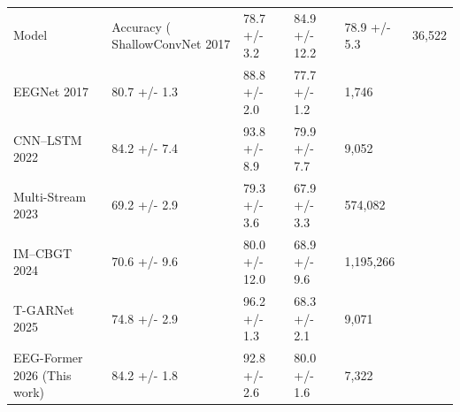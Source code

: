 \begin{tabular}{lllll}
\toprule
Model & Accuracy (%
\midrule
ShallowConvNet 2017 & 78.7 +/- 3.2 & 84.9 +/- 12.2 & 78.9 +/- 5.3 & 36,522 \\
EEGNet 2017 & 80.7 +/- 1.3 & 88.8 +/- 2.0 & 77.7 +/- 1.2 & 1,746 \\
CNN--LSTM 2022 & 84.2 +/- 7.4 & 93.8 +/- 8.9 & 79.9 +/- 7.7 & 9,052 \\
Multi-Stream 2023 & 69.2 +/- 2.9 & 79.3 +/- 3.6 & 67.9 +/- 3.3 & 574,082 \\
IM--CBGT 2024 & 70.6 +/- 9.6 & 80.0 +/- 12.0 & 68.9 +/- 9.6 & 1,195,266 \\
T-GARNet 2025 & 74.8 +/- 2.9 & 96.2 +/- 1.3 & 68.3 +/- 2.1 & 9,071 \\
EEG-Former 2026 (This work) & 84.2 +/- 1.8 & 92.8 +/- 2.6 & 80.0 +/- 1.6 & 7,322 \\
\bottomrule
\end{tabular}
